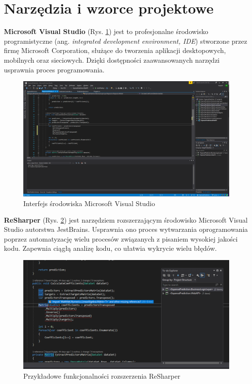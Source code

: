 \section{Narzędzia i wzorce projektowe}
\textbf{Microsoft Visual Studio} (Rys. \ref{vs_interfejs}) jest to profesjonalne środowisko programistyczne (ang. \textit{integrated development environment, IDE}) stworzone przez firmę Microsoft Corporation, służące do tworzenia aplikacji desktopowych, mobilnych oraz sieciowych. Dzięki dostępności zaawansowanych narzędzi usprawnia proces programowania.\cite{visualstudio}
\begin{figure}[!ht]
	\begin{center}
		\includegraphics[width=6in]{img/aplikacje/vs_interfejs.png}
		\caption{Interfejs środowiska Microsoft Visual Studio}
		\label{vs_interfejs}
	\end{center}
\end{figure}

\textbf{ReSharper} (Rys. \ref{resharper_interfejs}) jest narzędziem rozszerzającym środowisko Microsoft Visual Studio autorstwa JestBrains. Usprawnia ono proces wytwarzania oprogramowania poprzez automatyzację wielu procesów związanych z pisaniem wysokiej jakości kodu. Zapewnia ciągłą analizę kodu, co ułatwia wykrycie wielu błędów.\cite{resharper}
\begin{figure}[!ht]
	\begin{center}
		\includegraphics[width=6in]{img/aplikacje/resharper_interfejs.png}
		\caption{Przykładowe funkcjonalności rozszerzenia ReSharper}
		\label{resharper_interfejs}
	\end{center}
\end{figure}

